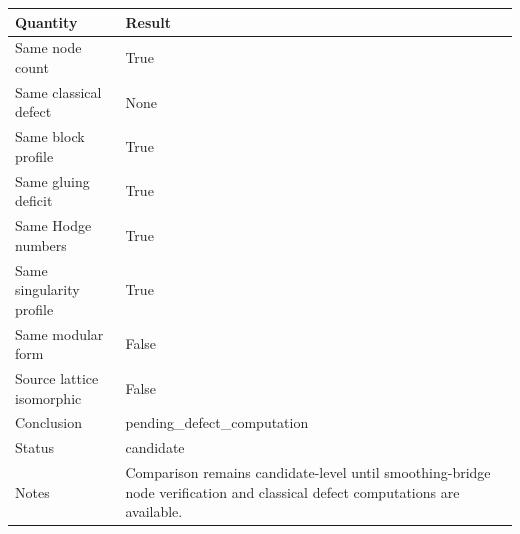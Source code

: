 \begin{tabular}{@{}p{4.8cm}p{8.8cm}@{}}
\toprule
Quantity & Result \\
\midrule
Same node count & True \\
Same classical defect & None \\
Same block profile & True \\
Same gluing deficit & True \\
Same Hodge numbers & True \\
Same singularity profile & True \\
Same modular form & False \\
Source lattice isomorphic & False \\
Conclusion & pending_defect_computation \\
Status & candidate \\
Notes & Comparison remains candidate-level until smoothing-bridge node verification and classical defect computations are available. \\
\bottomrule
\end{tabular}
